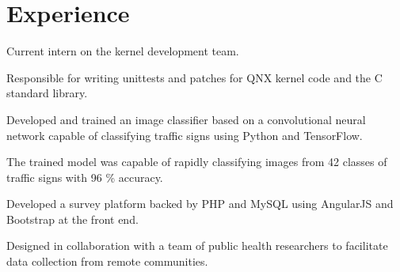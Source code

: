 \documentclass[]{chowes-resume}
\begin{document}
\begin{minipage}[t]{0.66\textwidth} 


\section{Experience}

\vspace{\topsep} %
\begin{tightemize}
\item Current intern on the kernel development team.
\item Responsible for writing unittests and patches for QNX kernel code and the C standard library.
\end{tightemize}
\sectionsep

\begin{tightemize}
\item Developed and trained an image classifier based on a convolutional neural network capable of classifying traffic signs using Python and TensorFlow.
\item The trained model was capable of rapidly classifying images from 42 classes of traffic signs with 96 \% accuracy.
\end{tightemize}
\sectionsep

\begin{tightemize}
\item Developed a survey platform backed by PHP and MySQL using AngularJS and Bootstrap at the front end. 
\item Designed in collaboration with a team of public health researchers to facilitate data collection from remote communities.
\end{tightemize}
\sectionsep



\end{minipage}
\end{document}
